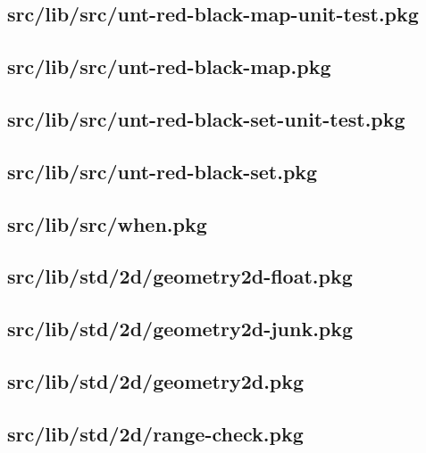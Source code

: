 \subsection{src/lib/src/unt-red-black-map-unit-test.pkg}


\subsection{src/lib/src/unt-red-black-map.pkg}


\subsection{src/lib/src/unt-red-black-set-unit-test.pkg}


\subsection{src/lib/src/unt-red-black-set.pkg}


\subsection{src/lib/src/when.pkg}


\subsection{src/lib/std/2d/geometry2d-float.pkg}


\subsection{src/lib/std/2d/geometry2d-junk.pkg}


\subsection{src/lib/std/2d/geometry2d.pkg}


\subsection{src/lib/std/2d/range-check.pkg}



